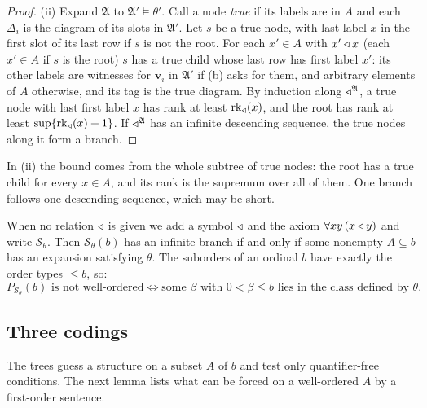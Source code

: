 \documentclass[11pt]{article}
\begin{document}
\begin{proof}
(ii) Expand $\mathfrak A$ to $\mathfrak A' \models \theta'$. Call a node \emph{true} if its labels are in $A$ and
each $\Delta_i$ is the diagram of its slots in $\mathfrak A'$. Let $s$ be a true node, with last label $x$ in the
first slot of its last row if $s$ is not the root. For each $x' \in A$ with $x' \triangleleft x$ (each $x' \in A$ if $s$ is the
root) $s$ has a true child whose last row has first label $x'$: its other labels are witnesses for $\mathbf v_i$ in
$\mathfrak A'$ if (b) asks for them, and arbitrary elements of $A$ otherwise, and its tag is the true diagram. By
induction along $\triangleleft^{\mathfrak A}$, a true node with last first label $x$ has rank at least
$\operatorname{rk}_{\triangleleft}(x)$, and the root has rank at least $\sup\{\operatorname{rk}_{\triangleleft}(x) + 1\}$. If
$\triangleleft^{\mathfrak A}$ has an infinite descending sequence, the true nodes along it form a branch.
\end{proof}

In (ii) the bound comes from the whole subtree of true nodes: the root has a true child for every $x \in A$, and
its rank is the supremum over all of them. One branch follows one descending sequence, which may be short.

When no relation
$\triangleleft$ is given we add a symbol $\triangleleft$ and the axiom $\forall x y\, (x \triangleleft y)$ and write $\mathcal S_\theta$. Then
$\mathcal S_\theta(b)$ has an infinite branch if and only if some nonempty $A \subseteq b$ has an expansion
satisfying $\theta$. The suborders of an ordinal $b$ have exactly the order types $\le b$, so:
\begin{equation}
P_{\mathcal S_\theta}(b) \text{ is not well-ordered} \iff \text{some } \beta \text{ with } 0 < \beta \le b
\text{ lies in the class defined by } \theta . \tag{3.1}
\end{equation}

\subsection{Three codings}

The trees guess a structure on a subset $A$ of $b$ and test only quantifier-free conditions. The next lemma lists
what can be forced on a well-ordered $A$ by a first-order sentence.
\end{document}
